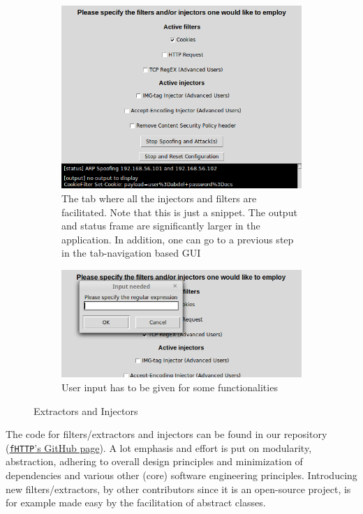 \begin{figure}[t!]
	\centering
	\begin{subfigure}{0.45\textwidth}
	\includegraphics[width=\textwidth]{img/injection_filtering.png}
		\caption{The tab where all the injectors and filters are facilitated. Note that this is just a snippet. The output and status frame are significantly larger in the application. In addition, one can go to a previous step in the tab-navigation based GUI}
	\end{subfigure}

	\begin{subfigure}{0.45\textwidth}
		\includegraphics[width=\textwidth]{img/tcp_reg_ex.png}
		\caption{User input has to be given for some functionalities}
	\end{subfigure}
\caption{
	Extractors and Injectors}
	\label{fig:injection_filtering}
\end{figure}

The code for filters/extractors and injectors can be found in our repository (\href{https://github.com/akbokha/fhttp}{\texttt{fHTTP}'s GitHub page}). A lot emphasis and effort is put on modularity, abstraction, adhering to overall design principles and minimization of dependencies and various other (core) software engineering principles. Introducing new filters/extractors, by other contributors since it is an open-source project, is for example made easy by the facilitation of abstract classes.